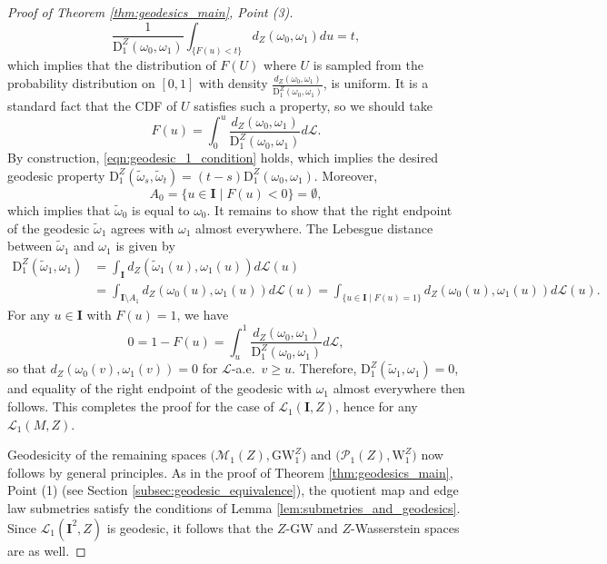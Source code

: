 \documentclass{article}
\theoremstyle{definition}
\newcommand{\M}{\mathcal{M}}
\newcommand{\MZ}[1]{\M_{#1}(Z)}
\newcommand{\dgw}[1]{\mathrm{GW}_{#1}^Z}
\newcommand{\WZp}[1]{\mathcal{P}_{#1}(Z)}
\newcommand{\wzp}[1]{\mathrm{W}_{#1}^Z}
\newcommand{\Lpp}[1]{\mathcal{L}_{#1}}
\newcommand{\dz}[1]{\mathrm{D}^Z_{#1}}
\begin{document}
\begin{proof}[Proof of Theorem \ref{thm:geodesics_main}, Point (3)]
    \begin{equation}
    \frac{1}{\dz{1}(\omega_0,\omega_1)}\int_{\{F(u)<t\}}d_Z(\omega_0,\omega_1)du = t,
    \end{equation}
    which implies that the distribution of $F(U)$ where $U$ is sampled from the probability distribution on $[0,1]$ with density $\frac{d_Z(\omega_0,\omega_1)}{\dz{1}(\omega_0,\omega_1)}$, is uniform. It is a standard fact that the CDF of $U$ satisfies such a property, so we should take
    \begin{equation}
        F(u) = \int_{0}^{u}\frac{d_Z(\omega_0,\omega_1)}{\dz{1}(\omega_0,\omega_1)} d\mathscr{L}.
    \end{equation}
    By construction, \eqref{eqn:geodesic_1_condition} holds, which implies the desired geodesic property $\dz{1}(\tilde{\omega}_s,\tilde{\omega}_t) = (t-s)\dz{1}(\omega_0,\omega_1)$. Moreover, 
    \[
    A_0=\{u \in \mathbf{I} \mid F(u) < 0\} = \emptyset,
    \]
    which implies that $\tilde{\omega}_0$ is equal to $\omega_0$. It remains to show that the right endpoint of the geodesic $\tilde{\omega}_1$ agrees with $\omega_1$ almost everywhere. The Lebesgue distance between $\tilde{\omega}_1$ and $\omega_1$ is given by 
    \begin{align*}
        \dz{1}(\tilde{\omega}_1,\omega_1) &= \int_\mathbf{I} d_Z(\tilde{\omega}_1(u),\omega_1(u)) d\mathscr{L}(u) \\
        &=\int_{\mathbf{I} \setminus A_1} d_Z(\omega_0(u),\omega_1(u)) d\mathscr{L}(u) 
        = \int_{\{u \in \mathbf{I} \mid F(u) = 1\}} d_Z(\omega_0(u),\omega_1(u)) d\mathscr{L}(u).
    \end{align*}
    For any $u \in \mathbf{I}$ with $F(u) = 1$, we have 
    \[
    0 = 1- F(u) = \int_u^1 \frac{d_Z(\omega_0,\omega_1)}{\dz{1}(\omega_0,\omega_1)} d\mathscr{L},
    \]
    so that $d_Z(\omega_0(v),\omega_1(v)) = 0$ for $\mathscr{L}$-a.e.\, $v \geq u$. Therefore, $\dz{1}(\tilde{\omega}_1,\omega_1) = 0$, and equality of the right endpoint of the geodesic with $\omega_1$ almost everywhere then follows.
%
%
%
%
%
%
%
%
%
%
%
%
%
%
%
%
%
%
%
%
%
%
    This completes the proof for the case of $\mathcal{L}_1(\mathbf{I},Z)$, hence for any $\mathcal{L}_1(M,Z)$.
    



    Geodesicity of the remaining spaces $\bigl(\MZ{1},\dgw{1}\bigr)$ and $\bigl(\WZp{1},\wzp{1}\bigr)$ now follows by general principles. As in the proof of Theorem \ref{thm:geodesics_main}, Point (1) (see Section \ref{subsec:geodesic_equivalence}), the quotient map and edge law submetries satisfy the conditions of Lemma \ref{lem:submetries_and_geodesics}. Since $\Lpp{1}(\mathbf{I}^2,Z)$ is geodesic, it follows that the $Z$-GW and $Z$-Wasserstein spaces are as well.
\end{proof}
\end{document}
